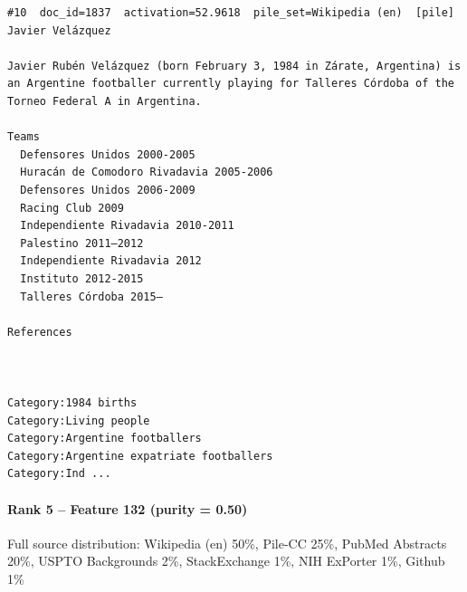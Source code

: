 \begin{verbatim}
#10  doc_id=1837  activation=52.9618  pile_set=Wikipedia (en)  [pile]
Javier Velázquez

Javier Rubén Velázquez (born February 3, 1984 in Zárate, Argentina) is an Argentine footballer currently playing for Talleres Córdoba of the Torneo Federal A in Argentina.

Teams
  Defensores Unidos 2000-2005
  Huracán de Comodoro Rivadavia 2005-2006
  Defensores Unidos 2006-2009
  Racing Club 2009
  Independiente Rivadavia 2010-2011
  Palestino 2011–2012
  Independiente Rivadavia 2012
  Instituto 2012-2015
  Talleres Córdoba 2015–

References
 
 

Category:1984 births
Category:Living people
Category:Argentine footballers
Category:Argentine expatriate footballers
Category:Ind ...

\end{verbatim}

\paragraph*{Rank 5 -- Feature 132 (purity = 0.50)}

Full source distribution: Wikipedia (en) 50\%, Pile-CC 25\%, PubMed Abstracts 20\%, USPTO Backgrounds 2\%, StackExchange 1\%, NIH ExPorter 1\%, Github 1\%

